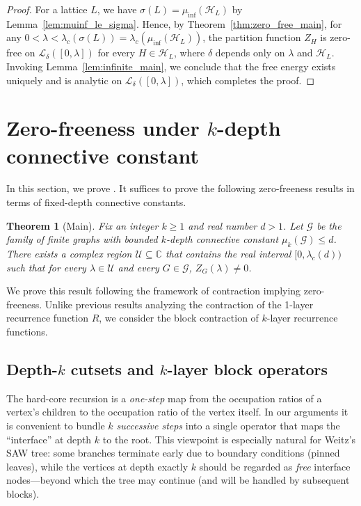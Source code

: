 \documentclass[a4paper,11pt]{article}
\theoremstyle{plain}
\newtheorem{theorem}{Theorem}[section]
\theoremstyle{definition}
\theoremstyle{remark}
\newcommand{\1}{\mathbf{1}}
\newcommand{\C}{\mathbb{C}}
\begin{document}
\begin{proof}
    For a lattice $L$, we have $\sigma(L)=\mu_{\inf}(\mathcal{H}_L)$ by Lemma~\ref{lem:muinf_le_sigma}. Hence, by Theorem~\ref{thm:zero_free_main}, for any $0<\lambda<\lambda_c(\sigma(L))=\lambda_c(\mu_{\inf}(\mathcal{H}_L))$, the partition function $Z_{H}$ is zero-free on $\mathcal{L}_{\delta}([0,\lambda])$ for every $H\in \mathcal{H}_L$, where $\delta$ depends only on $\lambda$ and $\mathcal{H}_L$. Invoking Lemma~\ref{lem:infinite_main}, we conclude that the free energy exists uniquely and is analytic on $\mathcal{L}_{\delta}([0,\lambda])$, which completes the proof.   
\end{proof}






\section{Zero-freeness under $k$-depth connective constant}\label{sec:positive}
In this section, we prove . 
It suffices to prove the following zero-freeness results in terms of fixed-depth connective constants. 

\begin{theorem}[Main]\label{thm:zero-free}
Fix an integer $k\ge 1$ and real number $d > 1$.
Let $\mathcal{G}$ be the family of finite graphs with bounded $k$-depth connective constant
$\mu_k(\mathcal{G})\le d$.
There exists a complex region $\mathcal{U}\subseteq \C$ that contains the real interval $[0,\lambda_c(d))$ such that for every $\lambda\in \mathcal{U}$ and every $G\in\mathcal{G}$,
$Z_G(\lambda) \neq 0$.
\end{theorem}


We prove this result following the framework of contraction implying zero-freeness.
Unlike previous results analyzing the contraction of the 1-layer recurrence function $R$, 
we consider the block contraction of $k$-layer recurrence functions. 


\subsection{Depth-$k$ cutsets and $k$-layer block operators}
The hard-core recursion is a \emph{one-step} map from the occupation ratios of a vertex's children to the occupation ratio
of the vertex itself. In our arguments it is convenient to bundle \emph{$k$ successive steps} into a single operator
that maps the ``interface'' at depth $k$ to the root.
This viewpoint is especially natural for Weitz's SAW tree: some branches terminate early due to boundary conditions
(pinned leaves), while the vertices at depth exactly $k$ should be regarded as \emph{free} interface nodes---beyond
which the tree may continue (and will be handled by subsequent blocks).
\end{document}
